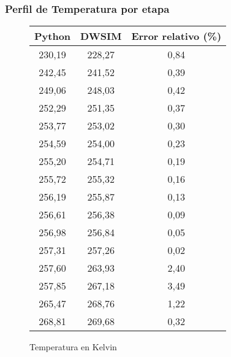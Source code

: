 \subsubsection{Perfil de Temperatura por etapa}
\begin{figure}[H]
    \centering
    \caption{Temperatura en Kelvin}
    \small
    \begin{tabular}{|c|c|c|}
        \hline
        \textbf{Python} & \textbf{DWSIM} & \textbf{Error relativo (\%)} \\
        \hline
        230,19          & 228,27         & 0,84                         \\
        \hline
        242,45          & 241,52         & 0,39                         \\
        \hline
        249,06          & 248,03         & 0,42                         \\
        \hline
        252,29          & 251,35         & 0,37                         \\
        \hline
        253,77          & 253,02         & 0,30                         \\
        \hline
        254,59          & 254,00         & 0,23                         \\
        \hline
        255,20          & 254,71         & 0,19                         \\
        \hline
        255,72          & 255,32         & 0,16                         \\
        \hline
        256,19          & 255,87         & 0,13                         \\
        \hline
        256,61          & 256,38         & 0,09                         \\
        \hline
        256,98          & 256,84         & 0,05                         \\
        \hline
        257,31          & 257,26         & 0,02                         \\
        \hline
        257,60          & 263,93         & 2,40                         \\
        \hline
        257,85          & 267,18         & 3,49                         \\
        \hline
        265,47          & 268,76         & 1,22                         \\
        \hline
        268,81          & 269,68         & 0,32                         \\

\end{tabular}
\end{figure}
